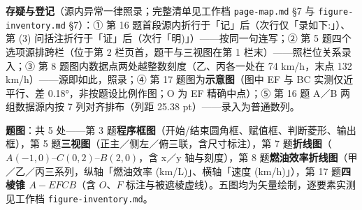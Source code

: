 \begin{gktip}
\textbf{存疑与登记}（源内异常一律照录；完整清单见工作档 \texttt{page-map.md} §7 与 \texttt{figure-inventory.md} §7）：① 第 16 题首段源内折行于「记」后（次行仅「录如下:」）、第 (3) 问括注折行于「证」后（次行「明)」）——按同一句连写；② 第 5 题四个选项源排跨栏（位于第 2 栏页首，题干与三视图在第 1 栏末）——照栏位关系录入；③ 第 8 题图内数据点两处越整数刻度（乙、丙各一处在 74 km/h，末点 132 km/h）——源即如此，照录；④ 第 17 题图为\textbf{示意图}（图中 EF 与 BC 实测仅近平行、差 0.18°，非按题设比例作图；O 为 EF 精确中点）；⑤ 第 16 题 A／B 两组数据源内按 7 列对齐排布（列距 25.38 pt）——录入为普通数列。

\textbf{题图}：共 5 处——第 3 题\textbf{程序框图}（开始/结束圆角框、赋值框、判断菱形、输出框），第 5 题\textbf{三视图}（正主／侧左／俯三联，含尺寸标注），第 7 题\textbf{折线图}（\(A(-1,0)\)–\(C(0,2)\)–\(B(2,0)\)，含 x／y 轴与刻度），第 8 题\textbf{燃油效率折线图}（甲／乙／丙三系列，纵轴「燃油效率 (km/L)」、横轴「速度 (km/h)」），第 17 题\textbf{四棱锥 \(A-EFCB\)}（含 \(O\)、\(F\) 标注与被遮棱虚线）。五图均为矢量绘制，逐要素实测见工作档 \texttt{figure-inventory.md}。
\end{gktip}



